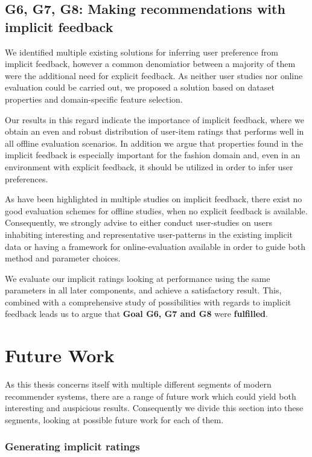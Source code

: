 \subsection{G6, G7, G8: Making recommendations with implicit feedback}
\label{sec:implicit-discussion}

We identified multiple existing solutions for inferring user preference from
implicit feedback, however a common denomiatior between a majority of them were
the additional need for explicit feedback. As neither user studies nor
online evaluation could be carried out, we proposed a solution based on
dataset properties and domain-specific feature selection.

Our results in this regard indicate the importance of implicit feedback, where
we obtain an even and robust distribution of user-item ratings that performs
well in all offline evaluation scenarios. In addition we argue that properties
found in the implicit feedback is especially important for the fashion domain
and, even in an environment with explicit feedback, it should be utilized in
order to infer user preferences.

As have been highlighted in multiple studies on implicit feedback, there exist
no good evaluation schemes for offline studies, when no explicit feedback is
available. Consequently, we strongly advise to either conduct user-studies on
users inhabiting interesting and representative user-patterns in the existing
implicit data or having a framework for online-evaluation available in order to
guide both method and parameter choices.

We evaluate our implicit ratings looking at performance using the same
parameters in all later components, and achieve a satisfactory result. This,
combined with a comprehensive study of possibilities with regards to implicit
feedback leads us to argue that \textbf{Goal G6, G7 and G8} were
\textbf{fulfilled}.

\section{Future Work}

As this thesis concerns itself with multiple different segments of modern
recommender systems, there are a range of future work which could yield
both interesting and auspicious results. Consequently we divide this section
into these segments, looking at possible future work for each of them.

\subsubsection{Generating implicit ratings}


